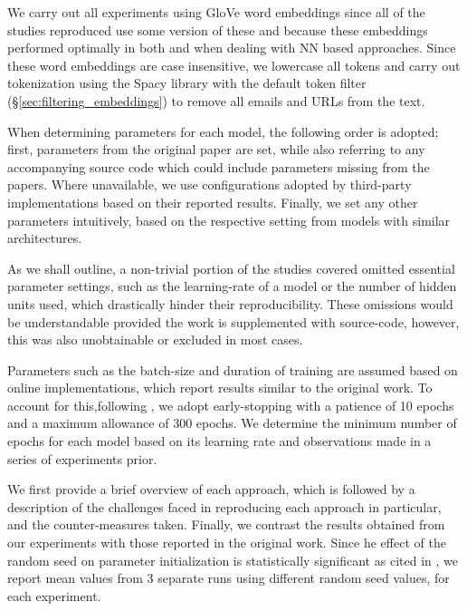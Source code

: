\documentclass[../../fyp.tex]{subfiles}
\begin{document}
We carry out all experiments using GloVe word embeddings \cite{pennington} since all of the studies reproduced use some version of these and because these embeddings performed optimally in both \cite{moore2018} and \cite{bhuwandhingra2017} when dealing with NN based approaches. Since these word embeddings are case insensitive, we lowercase all tokens and carry out tokenization using the Spacy library with the default token filter (\S\ref{sec:filtering_embeddings}) to remove all emails and URLs from the text.

When determining parameters for each model, the following order is adopted; first, parameters from the original paper are set, while also referring to any accompanying source code which could include parameters missing from the papers. Where unavailable, we use configurations adopted by third-party implementations based on their reported results. Finally, we set any other parameters intuitively, based on the respective setting from models with similar architectures. 

As we shall outline, a non-trivial portion of the studies covered omitted essential parameter settings, such as the learning-rate of a model or the number of hidden units used, which drastically hinder their reproducibility. These omissions would be understandable provided the work is supplemented with source-code, however, this was also unobtainable or excluded in most cases.

Parameters such as the batch-size and duration of training are assumed based on online implementations, which report results similar to the original work. To account for this,following \cite{moore2018}, we adopt early-stopping with a patience of 10 epochs and a maximum allowance of 300 epochs. We determine the minimum number of epochs for each model based on its learning rate and observations made in a series of experiments prior.

We first provide a brief overview of each approach, which is followed by a description of the challenges faced in reproducing each approach in particular, and the counter-measures taken. Finally, we contrast the results obtained from our experiments with those reported in the original work. Since he effect of the random seed on parameter initialization is statistically significant \cite{reimers2017} as cited in \cite{moore2018}, we report mean values from 3 separate runs using different random seed values, for each experiment. 
\end{document}
